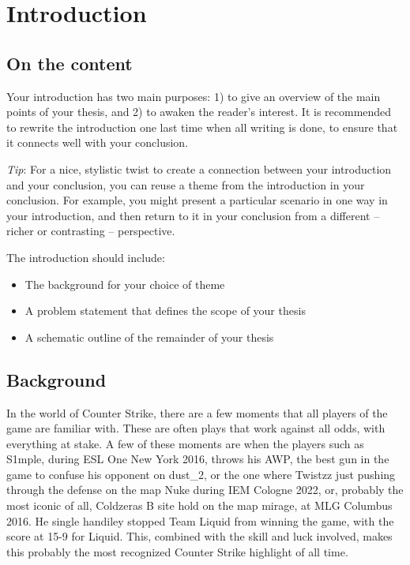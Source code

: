 \chapter{Introduction}
\label{chp:introduction}  %
\section{On the content}
Your introduction has two main purposes: 1) to give an overview of the main points of your thesis, and 2) to awaken the reader's interest. It is recommended to rewrite the introduction one last time when all writing is done, to ensure that it connects well with your conclusion.

\emph{Tip}: For a nice, stylistic twist to create a connection between your introduction and your conclusion, you can reuse a theme from the introduction in your conclusion. For example, you might present a particular scenario in one way in your introduction, and then return to it in your conclusion from a different -- richer or contrasting -- perspective.

The introduction should include:
\begin{itemize}
    \item The background for your choice of theme
    \item A problem statement that defines the scope of your thesis
    \item A schematic outline of the remainder of your thesis 
\end{itemize}


\section{Background}
In the world of Counter Strike, there are a few moments that all players of the game are familiar with. These are often plays that work against all odds, with everything at stake. A few of these moments are when the players such as S1mple, during ESL One New York 2016, throws his AWP, the best gun in the game to confuse his opponent on dust\_2, or the one where Twistzz just pushing through the defense on the map Nuke during IEM Cologne 2022, or, probably the most iconic of all, Coldzeras B site hold on the map mirage, at MLG Columbus 2016. He single handiley stopped Team Liquid from winning the game, with the score at 15-9 for Liquid. This, combined with the skill and luck involved, makes this probably the most recognized Counter Strike highlight of all time.



